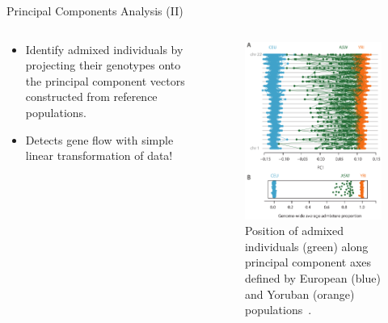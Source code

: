 \documentclass{beamer}
\begin{document}
\begin{frame}{Principal Components Analysis (II)}
  \begin{columns}
    \begin{column}{0.48\textwidth}
      \begin{itemize}
        \item Identify admixed individuals by projecting their genotypes onto
          the principal component vectors constructed from reference
          populations.
        \item Detects gene flow with simple linear transformation of data!
      \end{itemize}
    \end{column}
    \begin{column}{0.48\textwidth}
      \begin{figure}
        \includegraphics[width=\linewidth,keepaspectratio]{../Figures/fig3.png}
        \caption{Position of admixed individuals (green) along principal
          component axes defined by European (blue) and Yoruban (orange)
          populations~\cite{mcvean_genealogical_2009}.}
      \end{figure}
    \end{column}
  \end{columns}
\end{frame}
\end{document}
